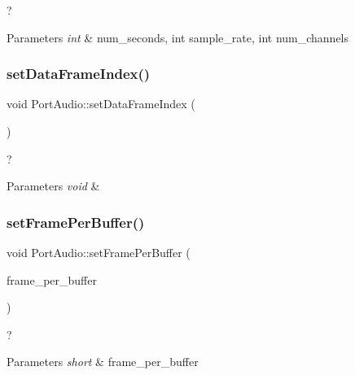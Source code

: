 ? 


\begin{DoxyParams}{Parameters}
{\em int} & num\+\_\+seconds, int sample\+\_\+rate, int num\+\_\+channels \\
\hline
\end{DoxyParams}
\mbox{\label{class_port_audio_a42e4b5882022a7ccd8696d9656ea686d}} 
\subsubsection{\texorpdfstring{set\+Data\+Frame\+Index()}{setDataFrameIndex()}}
{\footnotesize\ttfamily void Port\+Audio\+::set\+Data\+Frame\+Index (\begin{DoxyParamCaption}{ }\end{DoxyParamCaption})}



? 


\begin{DoxyParams}{Parameters}
{\em void} & \\
\hline
\end{DoxyParams}
\mbox{\label{class_port_audio_ad86fa6db404b8f563b7eb92c1b4359b5}} 
\subsubsection{\texorpdfstring{set\+Frame\+Per\+Buffer()}{setFramePerBuffer()}}
{\footnotesize\ttfamily void Port\+Audio\+::set\+Frame\+Per\+Buffer (\begin{DoxyParamCaption}\item[{short}]{frame\+\_\+per\+\_\+buffer }\end{DoxyParamCaption})}



? 


\begin{DoxyParams}{Parameters}
{\em short} & frame\+\_\+per\+\_\+buffer \\
\hline
\end{DoxyParams}
\mbox{\label{class_port_audio_aba9d07307c1d1da76f60b34c36e7b307}} 
